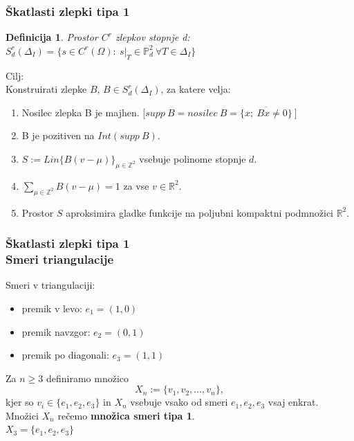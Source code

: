 \documentclass{beamer}
\newtheorem{definicija}{Definicija}
\begin{document}
\begin{frame}
\frametitle{Škatlasti zlepki tipa 1}

\begin{definicija}
Prostor $C^r$ zlepkov stopnje d: $S_d^r(\Delta_I) = \{ s \in C^r(\Omega):\ s|_T \in \mathbb{P}_d^2\  \forall T \in  \Delta_I\}$
\end{definicija}

\vspace{5mm}
Cilj: \\
Konstruirati zlepke $B$, $B \in S_d^r (\Delta_I)$, za katere velja:
\begin{enumerate}
\item Nosilec zlepka B je majhen.  $\big[ supp\ B = nosilec\ B = \overline{\{x;\ Bx \neq 0\}}\ \big] $
\item B je pozitiven na $Int(supp\ B)$.
\item $S := Lin \{ B(v-\mu)  \}_{\mu \in \mathbb{Z}^2}$ vsebuje polinome stopnje $d$.
\item $\sum_{\mu \in \mathbb{Z}^2} B(v-\mu)  = 1$ za vse $v \in \mathbb{R}^2$.
\item Prostor $S$ aproksimira gladke funkcije na poljubni kompaktni podmnožici $\mathbb{R}^2$.
\end{enumerate}

\end{frame}


\begin{frame}
\frametitle{Škatlasti zlepki tipa 1 \\ Smeri triangulacije}

Smeri v triangulaciji:
\begin{itemize}
\item premik v levo: $e_1 = (1,0)$
\item premik navzgor: $e_2 = (0,1)$
\item premik po diagonali: $e_3 = (1,1)$
\end{itemize}

\vspace{5mm}

Za $n \geq 3$ definiramo množico  $$X_n := \{v_1, v_2, \ldots , v_n\},$$ kjer so $v_i \in \{e_1, e_2, e_3\}$ in $X_n$ vsebuje vsako od smeri $e_1, e_2, e_3$ vsaj enkrat. \\
Množici $X_n$ rečemo \textbf{množica smeri tipa 1}.\\
\vspace{4mm}
$X_3 = \{e_1,e_2, e_3\}$
\end{frame}
\end{document}
